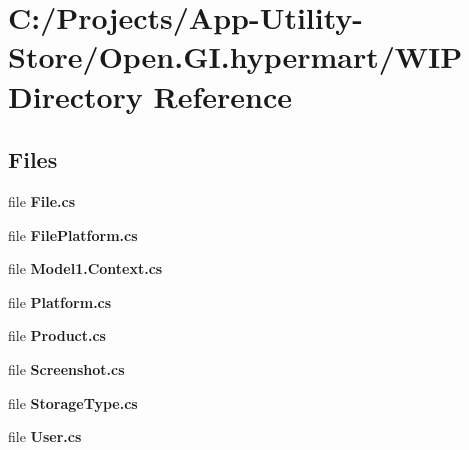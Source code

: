 \section{C\+:/\+Projects/\+App-\/\+Utility-\/\+Store/\+Open.G\+I.\+hypermart/\+W\+IP Directory Reference}
\label{dir_9c13ea36d9178e3e3691e4fb94688e22}
\subsection*{Files}
\begin{DoxyCompactItemize}
\item 
file \textbf{ File.\+cs}
\item 
file \textbf{ File\+Platform.\+cs}
\item 
file \textbf{ Model1.\+Context.\+cs}
\item 
file \textbf{ Platform.\+cs}
\item 
file \textbf{ Product.\+cs}
\item 
file \textbf{ Screenshot.\+cs}
\item 
file \textbf{ Storage\+Type.\+cs}
\item 
file \textbf{ User.\+cs}
\end{DoxyCompactItemize}
